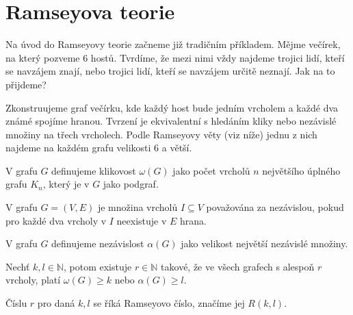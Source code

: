 \section{Ramseyova teorie}
\begin{t_example}
  Na úvod do Ramseyovy teorie začneme již tradičním příkladem. Mějme večírek, na který pozveme 6 hostů. Tvrdíme, že mezi nimi vždy najdeme trojici lidí, kteří se navzájem znají, nebo trojici lidí, kteří se navzájem určitě neznají. Jak na to přijdeme?

  Zkonstruujeme graf večírku, kde každý host bude jedním vrcholem a každé dva známé spojíme hranou. Tvrzení je ekvivalentní s hledáním kliky nebo nezávislé množiny na třech vrcholech. Podle Ramseyovy věty (viz níže) jednu z nich najdeme na každém grafu velikosti 6 a větší.
\end{t_example}

\begin{t_definition}
  V grafu $G$ definujeme klikovost $\omega(G)$ jako počet vrcholů $n$ největšího úplného grafu $K_n$, který je v $G$ jako podgraf.
\end{t_definition}

\begin{t_definition}
  V grafu $G=(V,E)$ je množina vrcholů $I\subseteq V$ považována za nezávislou, pokud pro každé dva vrcholy v $I$ neexistuje v $E$ hrana.
\end{t_definition}

\begin{t_definition}
  V grafu $G$ definujeme nezávislost $\alpha(G)$ jako velikost největší nezávislé množiny.
\end{t_definition}

\begin{t_theorem}
  Nechť $k,l\in\mathbb{N}$, potom existuje $r\in\mathbb{N}$ takové, že ve všech grafech s alespoň $r$ vrcholy, platí $\omega(G)\geq k$ nebo $\alpha(G)\geq l$.
\end{t_theorem}

\begin{t_remark}
  Číslu $r$ pro daná $k, l$ se říká Ramseyovo číslo, značíme jej $R(k, l)$.
\end{t_remark}

